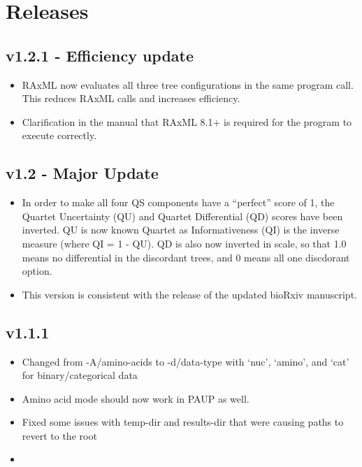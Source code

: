 \documentclass[letterpaper,12pt,english]{sphinxmanual}
\begin{document}
\chapter{Releases}
\label{\detokenize{releases:id1}}\label{\detokenize{releases::doc}}\label{\detokenize{releases:releases}}

\section{v1.2.1 - Efficiency update}
\label{\detokenize{releases:v1-2-1-efficiency-update}}\begin{itemize}
\item {} 
RAxML now evaluates all three tree configurations in the same program call.  This reduces RAxML calls and increases efficiency.

\item {} 
Clarification in the manual that RAxML 8.1+ is required for the program to execute correctly.

\end{itemize}


\section{v1.2 - Major Update}
\label{\detokenize{releases:v1-2-major-update}}\begin{itemize}
\item {} 
In order to make all four QS components have a “perfect” score of 1, the Quartet Uncertainty (QU) and Quartet Differential (QD) scores have been inverted. QU is now known Quartet as Informativeness (QI) is the inverse measure (where QI = 1 - QU).  QD is also now inverted in scale, so that 1.0 means no differential in the discordant trees, and 0 means all one discdorant option.

\item {} 
This version is consistent with the release of the updated bioRxiv manuscript.

\end{itemize}


\section{v1.1.1}
\label{\detokenize{releases:v1-1-1}}\begin{itemize}
\item {} 
Changed from -A/\textendash{}amino-acids to -d/\textendash{}data-type with ‘nuc’, ‘amino’, and ‘cat’ for binary/categorical data

\item {} 
Amino acid mode should now work in PAUP as well.

\item {} 
Fixed some issues with temp-dir and results-dir that were causing paths to revert to the root

\item {} 

\end{itemize}
\end{document}
